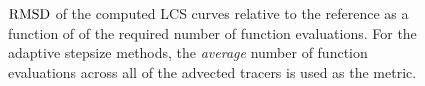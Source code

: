 \begin{figure}[htpb]
    \centering
    
    \caption[$\rmsd$ of the computed LCS curves relative to the reference as a
    function of the required number of function evaluations]
    {$\rmsd$ of the computed LCS curves relative to the reference as a
        function of of the required number of function evaluations. For the
        adaptive stepsize methods, the \emph{average} number of function
    evaluations across all of the advected tracers is used as the metric.}
    \label{fig:lcs_rmsd_fp_nn_both}
\end{figure}
